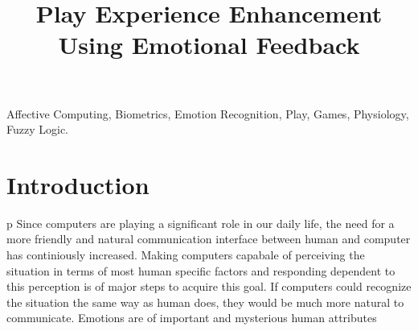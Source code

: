 \documentclass[conference]{include/IEEEtran}
\begin{document}

\title{Play Experience Enhancement Using Emotional Feedback}

\author{
}

\maketitle


\begin{abstract}
\label{sec:abs}
\blindtext
\end{abstract}

\begin{IEEEkeywords}
Affective Computing, Biometrics, Emotion Recognition, Play, Games, Physiology, Fuzzy Logic.
\end{IEEEkeywords}

\IEEEpeerreviewmaketitle


\section{Introduction}
\label{sec:intro}

p Since computers are playing a signiﬁcant role in our daily life, the need for a more friendly and natural communication interface between human and computer has continiously increased. Making computers capabale of perceiving the situation in terms of most human speciﬁc factors and responding dependent to this perception is of major steps to acquire this goal. If computers could recognize the situation the same way as human does, they would be much more natural to communicate.
Emotions are of important and mysterious human attributes
\end{document}
